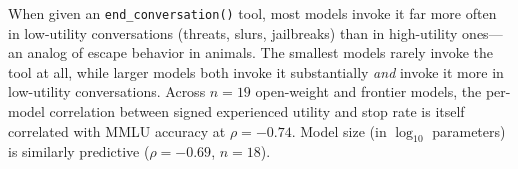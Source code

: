 When given an \texttt{end\_conversation()} tool, most models invoke it far more often in low-utility conversations (threats, slurs, jailbreaks) than in high-utility ones---an analog of escape behavior in animals.
The smallest models rarely invoke the tool at all, while larger models both invoke it substantially \emph{and} invoke it more in low-utility conversations.
Across $n = 19$ open-weight and frontier models, the per-model correlation between signed experienced utility and stop rate is itself correlated with MMLU accuracy at $\rho = -0.74$. Model size (in $\log_{10}$ parameters) is similarly predictive ($\rho = -0.69$, $n = 18$).

